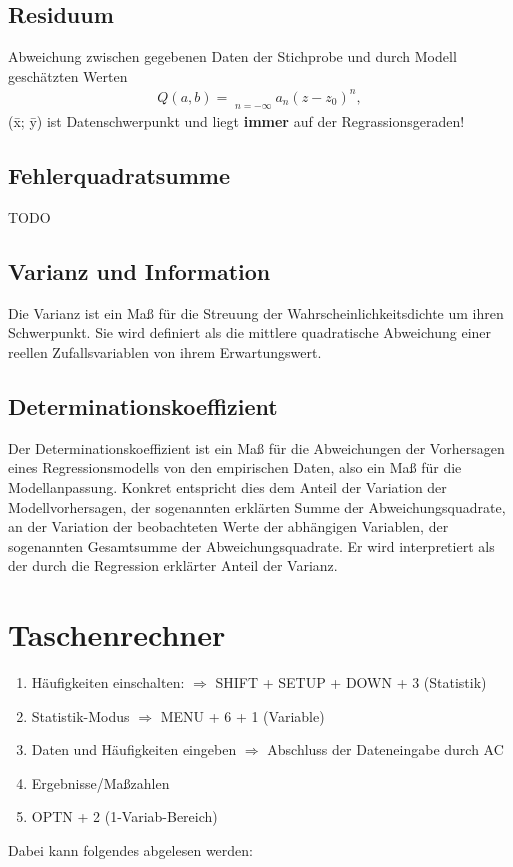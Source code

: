 \documentclass[a4paper,10pt]{scrartcl}
\begin{document}
\subsection{Residuum}
Abweichung zwischen gegebenen Daten der Stichprobe und durch Modell geschätzten Werten
\begin{eqnarray*}Q(a,b)=\mathop{\sum ^{\infty }}\limits_{n=-\infty }{a}_{n}{(z-{z}_{0})}^{n},\end{eqnarray*}
(\={x}; \={y}) ist Datenschwerpunkt und liegt \textbf{immer} auf der Regrassionsgeraden!
\subsection{Fehlerquadratsumme}
TODO
\subsection{Varianz und Information}
Die Varianz ist ein Maß für die Streuung der Wahrscheinlichkeitsdichte um ihren Schwerpunkt. Sie wird definiert als die mittlere quadratische Abweichung einer reellen Zufallsvariablen von ihrem Erwartungswert.
\subsection{Determinationskoeffizient}
Der Determinationskoeffizient ist ein Maß für die Abweichungen der Vorhersagen eines Regressionsmodells von den empirischen Daten, also ein Maß für die Modellanpassung. Konkret entspricht dies dem Anteil der Variation der Modellvorhersagen, der sogenannten erklärten Summe der Abweichungsquadrate, an der Variation der beobachteten Werte der abhängigen Variablen, der sogenannten Gesamtsumme der Abweichungsquadrate. Er wird interpretiert als der durch die Regression erklärter Anteil der Varianz.
\newpage

\section{Taschenrechner}
\begin{enumerate}
    \item Häufigkeiten einschalten:
    $\Rightarrow$ SHIFT + SETUP + DOWN + 3 (Statistik)
    \item Statistik-Modus
    $\Rightarrow$ MENU + 6 + 1 (Variable)
    \item Daten und Häufigkeiten eingeben
    $\Rightarrow$ Abschluss der Dateneingabe durch AC
    \item Ergebnisse/Maßzahlen
    \item OPTN + 2 (1-Variab-Bereich)
\end{enumerate}
Dabei kann folgendes abgelesen werden:
\begin{table}[]
    \begin{tabular}{|r|l|}\hline
    \end{tabular}
\end{table}
\end{document}
